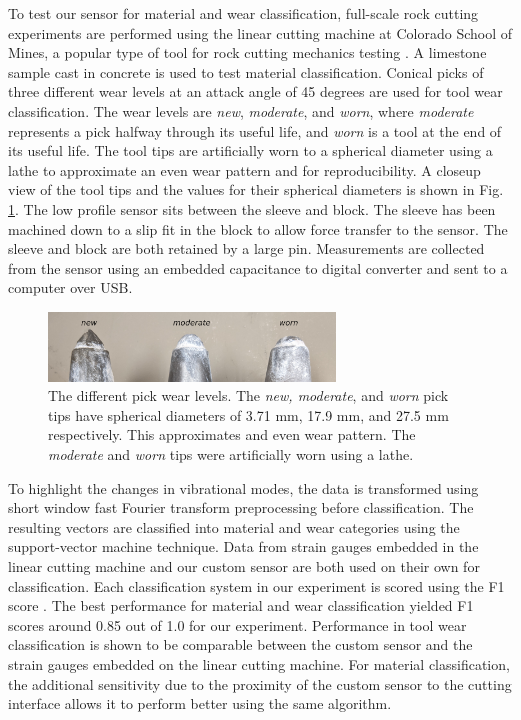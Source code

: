 To test our sensor for material and wear classification, full-scale rock cutting experiments are 
 performed using the linear cutting machine at Colorado School of Mines,
 a popular type of tool for rock cutting mechanics testing \cite{rostami21}.
A limestone sample cast in concrete is used to test material classification. 
Conical picks of three different wear levels at an attack angle of 45 degrees are used for tool wear classification.
The wear levels are \textit{new}, \textit{moderate}, and \textit{worn}, where \textit{moderate}
 represents a pick halfway through its useful life, and \textit{worn} is a tool at the end of its useful life.
The tool tips are artificially worn to a spherical diameter using a lathe 
 to approximate an even wear pattern and for reproducibility.
A closeup view of the tool tips and the values for their spherical diameters is shown in Fig. \ref{fig:tips}.
The low profile sensor sits between the sleeve and block.
The sleeve has been machined down to a slip fit in the block to allow force transfer to the sensor.
The sleeve and block are both retained by a large pin.
Measurements are collected from the sensor using an embedded capacitance to digital converter and sent to a 
 computer over USB.

\begin{figure}[t!]
\centering
\includegraphics[width=3in]{figures/p1_media/Fig2.png}
\caption{The different pick wear levels. The \textit{new, moderate}, and \textit{worn}  pick tips
  have spherical diameters of 3.71 mm, 17.9 mm, and 27.5 mm respectively. 
 This approximates and even wear pattern. 
 The \textit{moderate} and \textit{worn} tips were artificially worn using a lathe.}
\label{fig:tips}
\end{figure}

To highlight the changes in vibrational modes, the data is transformed using
 short window fast Fourier transform preprocessing before classification.
The resulting vectors are classified into material and wear categories 
 using the support-vector machine technique. 
Data from strain gauges embedded in the linear cutting machine and our custom sensor are 
 both used on their own for classification.
Each classification system in our experiment is scored using 
 the F1 score \cite{sasaki2007truth, powers2020evaluation}.
The best performance for material and wear classification  
 yielded F1 scores around 0.85 out of 1.0 for our experiment.
Performance in tool wear classification is shown to be comparable between the custom sensor and the 
 strain gauges embedded on the linear cutting machine. For material classification, the additional
 sensitivity due to the proximity of the custom sensor to the cutting interface allows it to 
 perform better using the same algorithm.

